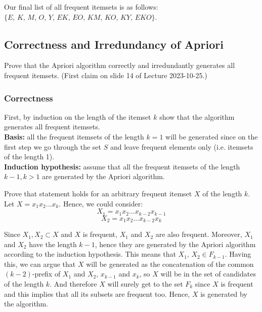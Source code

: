 \documentclass{article}
\begin{document}
  Our final list of all frequent itemsets is as follows:
  $\{E,\, K,\, M,\, O,\, Y,\, EK,\, EO,\, KM,\, KO,\, KY,\, EKO\}$.

  \subsection{Correctness and Irredundancy of Apriori}
  \begin{centerframebox}
    Prove that the Apriori algorithm correctly and irredundantly generates all frequent itemsets.
    (First claim on slide 14 of Lecture 2023-10-25.)
  \end{centerframebox}
  \subsubsection{Correctness}
  First, by induction on the length of the itemset $k$ show that the algorithm generates all frequent itemsets. \\
  \textbf{Basis:} all the frequent itemsets of the length $k = 1$ will be generated since on the first step we go through the set $S$ and leave frequent elements only (i.e. itemsets of the length 1). \\
  \textbf{Induction hypothesis:} assume that all the frequent itemsets of the length $k - 1, k > 1$ are generated by the Apriori algorithm.

  Prove that statement holds for an arbitrary frequent itemset $X$ of the length $k$.
  Let $X = x_1 x_2 ... x_k$. Hence, we could consider:
  $$X_1 = x_1 x_2 ... x_{k-2} x_{k-1}$$
  $$X_2 = x_1 x_2 ... x_{k-2} x_k$$

  Since $X_1, X_2 \subset X$ and $X$ is frequent, $X_1$ and $X_2$ are also frequent. Moreover, $X_1$ and $X_2$ have the length $k-1$, hence they are generated by the Apriori algorithm according to the induction hypothesis. This means that $X_1,\, X_2 \in F_{k-1}.$ Having this, we can argue that $X$ will be generated as the concatenation of the common $(k-2)$-prefix of $X_1$ and $X_2$, $x_{k-1}$ and $x_k$, so $X$ will be in the set of candidates of the length $k$. And therefore $X$ will surely get to the set $F_k$ since $X$ is frequent and this implies that all its subsets are frequent too. Hence, $X$ is generated by the algorithm.
\end{document}

